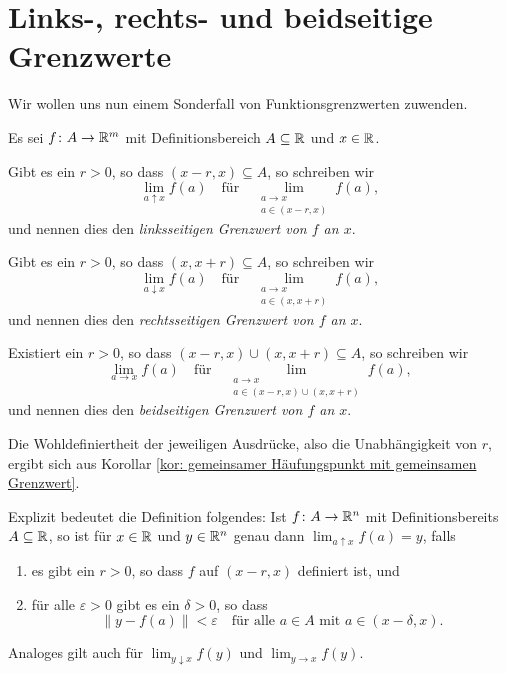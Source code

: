 \documentclass[a4paper,10pt]{article}
\begin{document}
\section{Links-, rechts- und beidseitige Grenzwerte}
Wir wollen uns nun einem Sonderfall von Funktionsgrenzwerten zuwenden.


\begin{defi}
 Es sei $f \colon A \to \mathbb{R}^m$ mit Definitionsbereich $A \subseteq \mathbb{R}$ und $x \in \mathbb{R}$.
 
 Gibt es ein $r > 0$, so dass $(x-r, x) \subseteq A$, so schreiben wir
 \[
  \lim_{a \uparrow x} f(a)
  \quad
  \text{für}
  \quad
  \lim_{\substack{a \to x \\ a \in (x-r,x)}} f(a),
 \]
 und nennen dies den \emph{linksseitigen Grenzwert von $f$ an $x$}.
 
 Gibt es ein $r > 0$, so dass $(x,x+r) \subseteq A$, so schreiben wir
 \[
  \lim_{a \downarrow x} f(a)
  \quad
  \text{für}
  \quad
  \lim_{\substack{a \to x \\ a \in (x,x+r)}} f(a),
 \]
 und nennen dies den \emph{rechtsseitigen Grenzwert von $f$ an $x$}.
 
 Existiert ein $r > 0$, so dass $(x-r,x) \cup (x,x+r) \subseteq A$, so schreiben wir
 \[
  \lim_{a \to x} f(a)
  \quad
  \text{für}
  \quad
  \lim_{\substack{a \to x \\ a \in (x-r,x) \cup (x,x+r)}} f(a),
 \]
 und nennen dies den \emph{beidseitigen Grenzwert von $f$ an $x$}.
\end{defi}


Die Wohldefiniertheit der jeweiligen Ausdrücke, also die Unabhängigkeit von $r$, ergibt sich aus Korollar \ref{kor: gemeinsamer Häufungspunkt mit gemeinsamen Grenzwert}.


\begin{bem}
 Explizit bedeutet die Definition folgendes: Ist $f \colon A \to \mathbb{R}^n$ mit Definitionsbereits $A \subseteq \mathbb{R}$, so ist für $x \in \mathbb{R}$ und $y \in \mathbb{R}^n$ genau dann $\lim_{a \uparrow x} f(a) = y$, falls
 \begin{enumerate}
  \item
   es gibt ein $r > 0$, so dass $f$ auf $(x-r,x)$ definiert ist, und
  \item
   für alle $\varepsilon > 0$ gibt es ein $\delta > 0$, so dass
   \[
   \|y - f(a)\| < \varepsilon
   \quad
   \text{für alle $a \in A$ mit $a \in (x-\delta,x)$}.
   \]
 \end{enumerate}
 Analoges gilt auch für $\lim_{y \downarrow x} f(y)$ und $\lim_{y \to x} f(y)$.
\end{bem}
\end{document}
